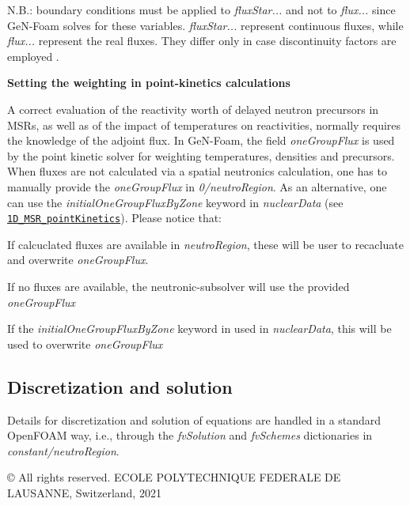 N.\+B.\+: boundary conditions must be applied to {\itshape flux\+Star...} and not to {\itshape flux...} since Ge\+N-\/\+Foam solves for these variables. {\itshape flux\+Star...} represent continuous fluxes, while {\itshape flux...} represent the real fluxes. They differ only in case discontinuity factors are employed \cite{FIORINA2016212}.

 {\bfseries Setting the weighting in point-\/kinetics calculations}

A correct evaluation of the reactivity worth of delayed neutron precursors in M\+S\+Rs, as well as of the impact of temperatures on reactivities, normally requires the knowledge of the adjoint flux. In Ge\+N-\/\+Foam, the field {\itshape one\+Group\+Flux} is used by the point kinetic solver for weighting temperatures, densities and precursors. When fluxes are not calculated via a spatial neutronics calculation, one has to manually provide the {\itshape one\+Group\+Flux} in {\itshape 0/neutro\+Region}. As an alternative, one can use the {\itshape initial\+One\+Group\+Flux\+By\+Zone} keyword in {\itshape nuclear\+Data} (see \href{https://gitlab.com/foam-for-nuclear/GeN-Foam/-/blob/master/Tutorials/1D_MSR_pointKinetics/rootCase/constant/neutroRegion/nuclearData}{\tt 1\+D\+\_\+\+M\+S\+R\+\_\+point\+Kinetics}). Please notice that\+: 
\begin{DoxyItemize}
\item If calcuclated fluxes are available in {\itshape neutro\+Region}, these will be user to recacluate and overwrite {\itshape one\+Group\+Flux}. 
\item If no fluxes are available, the neutronic-\/subsolver will use the provided {\itshape one\+Group\+Flux} 
\item If the {\itshape initial\+One\+Group\+Flux\+By\+Zone} keyword in used in {\itshape nuclear\+Data}, this will be used to overwrite {\itshape one\+Group\+Flux} 
\end{DoxyItemize}

\subsection*{Discretization and solution}

Details for discretization and solution of equations are handled in a standard Open\+F\+O\+AM way, i.\+e., through the {\itshape fv\+Solution} and {\itshape fv\+Schemes} dictionaries in {\itshape constant/neutro\+Region}.

© All rights reserved. E\+C\+O\+LE P\+O\+L\+Y\+T\+E\+C\+H\+N\+I\+Q\+UE F\+E\+D\+E\+R\+A\+LE DE L\+A\+U\+S\+A\+N\+NE, Switzerland, 2021 